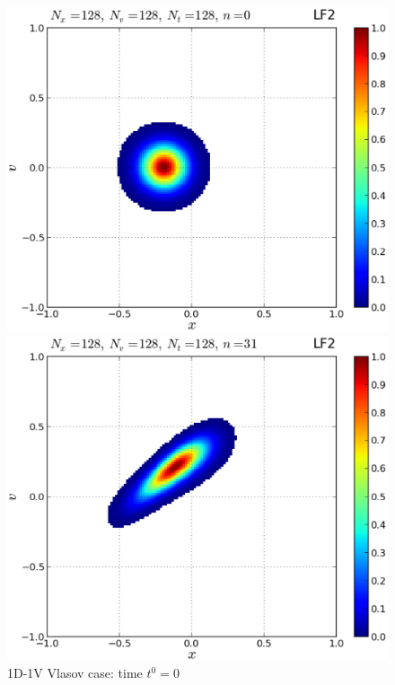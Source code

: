 \documentclass[11pt,titlepage]{report}
\begin{document}
\begin{figure}[h!] 
\label{fig:var_vel} 
\captionsetup{width=0.48\linewidth}
\begin{minipage}[b]{0.5\linewidth}
\centering
\includegraphics[width=\linewidth]{graphics/plot_-_1DVP_F12_Nx128Nv128Nt128_it00000}
\caption{1D-1V Vlasov case: time $t^0 = 0$}
\vspace{4ex}
\end{minipage}%
\begin{minipage}[b]{0.5\linewidth}
\centering
\includegraphics[width=\linewidth]{graphics/plot_-_1DVP_F12_Nx128Nv128Nt128_it00031}

\end{minipage}
\end{figure}
\end{document}
